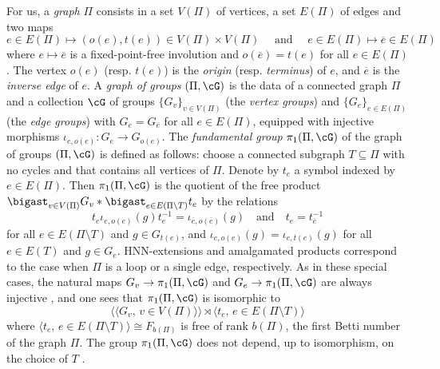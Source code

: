 \documentclass[reqno]{amsart}
\begin{document}
For us, a \emph{graph} $\Pi$ consists in a set $V(\Pi)$ of vertices, a set $E(\Pi)$ of edges and two maps 
\[
	e \in E(\Pi) \mapsto (o(e), t(e)) \in V(\Pi) \times V(\Pi) \quad \text{ and } \quad e \in E(\Pi) \mapsto \overline{e} \in E(\Pi)
\]
where $e \mapsto \overline{e}$ is a fixed-point-free involution and $o(\overline{e}) = t(e)$ for all $e \in E(\Pi)$. The vertex $o(e)$ (resp. $t(e)$) is the \emph{origin} (resp. \emph{terminus}) of $e$, and $\overline{e}$ is the \emph{inverse edge} of $e$. A \emph{graph of groups} $(\Pi, \cG)$ is the data of a connected graph $\Pi$ and a collection $\cG$ of groups $\{G_v\}_{v \in V(\Pi)}$ (the \emph{vertex groups}) and $\{G_e\}_{e \in E(\Pi)}$ (the \emph{edge groups}) with $G_e = G_{\overline{e}}$ for all $e \in E(\Pi)$, equipped with injective morphisms $\iota_{e,o(e)}\colon G_e \to G_{o(e)}$. The \emph{fundamental group} $\pi_1(\Pi, \cG)$ of the graph of groups $(\Pi, \cG)$ is defined as follows: choose a connected subgraph $T \subseteq \Pi$ with no cycles and that contains all vertices of $\Pi$. %
Denote by $t_e$ a symbol indexed by $e \in E(\Pi)$. Then $\pi_1(\Pi, \cG)$ is the quotient of the free product $\bigast_{v \in V(\Pi)} G_v \ast \bigast_{e \in E(\Pi \setminus T)} t_e$ by the relations 
\[
	t_e \iota_{e, o(e)}(g) t_e^{-1} = \iota_{\overline{e}, o(\overline{e})}(g) \quad \text{and} \quad t_e = t_{\overline{e}}^{-1}
\]
for all $e \in E(\Pi \setminus T)$ and $g \in G_{t(e)}$, and $\iota_{e, o(e)}(g) = \iota_{e,t(e)}(g)$ for all $e \in E(T)$ and $g \in G_{e}$. HNN-extensions and amalgamated products correspond to the case when $\Pi$ is a loop or a single edge, respectively. As in these special cases, the natural maps $G_v \to \pi_1(\Pi, \cG)$ and $G_e \to \pi_1(\Pi, \cG)$ are always injective \cite[Théorème 13]{Serre1977}, and %
one sees that $\pi_1(\Pi, \cG)$ is isomorphic to 
\[
	\langle \langle G_v,\, v \in V(\Pi)\rangle \rangle \rtimes \langle t_e,\,  e \in E(\Pi \setminus T)\rangle
\]
where $\langle t_e,\,  e \in E(\Pi \setminus T)\rangle \cong F_{b(\Pi)}$ is free of rank $b(\Pi)$, the first Betti number of the graph $\Pi$. The group $\pi_1(\Pi, \cG)$ does not depend, up to isomorphism, on the choice of $T$ \cite[Proposition 20]{Serre1977}.
\end{document}
